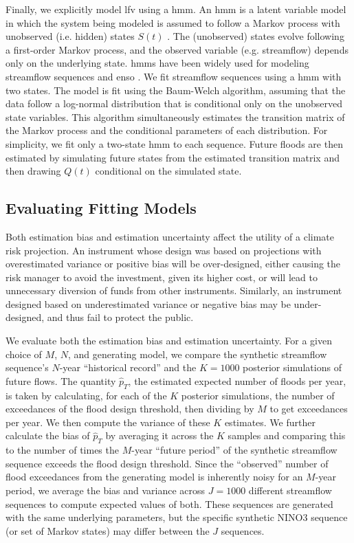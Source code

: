 \documentclass[
  draft,
  linenumbers
]{agujournal2019}
\begin{document}
Finally, we explicitly model \gls{lfv} using a \gls{hmm}.
An \gls{hmm} is a latent variable model in which the system being modeled is assumed to follow a Markov process with unobserved (i.e.\@\xspace hidden) states $S(t)$ \citep{Rabiner:1986jk}.
The (unobserved) states evolve following a first-order Markov process, and the observed variable (e.g.\@\xspace streamflow) depends only on the underlying state.
\Glspl{hmm} have been widely used for modeling streamflow sequences \citep{Bracken:2016ba} and \gls{enso} \citep{rojohernandez:2017}.
We fit  streamflow sequences using a \gls{hmm} with two states.
The model is fit using the Baum-Welch algorithm, assuming that the data follow a log-normal distribution that is conditional only on the unobserved state variables.
This algorithm simultaneously estimates the transition matrix of the Markov process and the conditional parameters of each distribution.
For simplicity, we fit only a two-state \gls{hmm} to each sequence.
Future floods are then estimated by simulating future states from the estimated transition matrix and then drawing $Q(t)$ conditional on the simulated state.

\subsection{Evaluating Fitting Models}\label{sec:methods-evaluating}

Both estimation bias and estimation uncertainty affect the utility of a climate risk projection.
An instrument whose design was based on projections with overestimated variance or positive bias will be over-designed, either causing the risk manager to avoid the investment, given its higher cost, or will lead to unnecessary diversion of funds from other instruments.
Similarly, an instrument designed based on underestimated variance or negative bias may be under-designed, and thus fail to protect the public.

We evaluate both the estimation bias and estimation uncertainty.
For a given choice of $M$, $N$, and generating model, we compare the synthetic streamflow sequence's $N$-year ``historical record'' and the $K=1000$ posterior simulations of future flows.
The quantity $\hat{p}_T$, the estimated expected number of floods per year, is taken by calculating, for each of the $K$ posterior simulations, the number of exceedances of the flood design threshold, then dividing by $M$ to get exceedances per year.
We then compute the variance of these $K$ estimates.
We further calculate the bias of $\hat{p}_T$ by averaging it across the $K$ samples and comparing this to the number of times the $M$-year ``future period'' of the synthetic streamflow sequence exceeds the flood design threshold.
Since the ``observed'' number of flood exceedances from the generating model is inherently noisy for an $M$-year period, we average the bias and variance across $J=1000$ different streamflow sequences to compute expected values of both.
These sequences are generated with the same underlying parameters, but the specific synthetic NINO3 sequence (or set of Markov states) may differ between the $J$ sequences.
\end{document}
